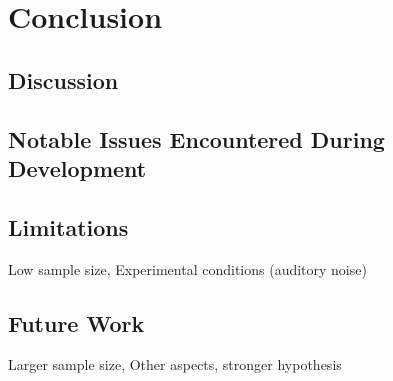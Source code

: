 \chapter{Conclusion}

\section{Discussion}

\section{Notable Issues Encountered During Development}

\section{Limitations}
Low sample size, Experimental conditions (auditory noise)

\section{Future Work}
Larger sample size, Other aspects, stronger hypothesis
